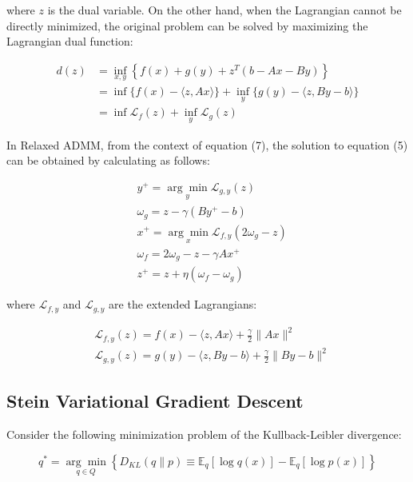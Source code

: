\documentclass[a4paper,fleqn,10pt,twocolumn]{SICE_ISCS}
\begin{document}
where $z$ is the dual variable. On the other hand, when the Lagrangian cannot be directly minimized, the original problem can be solved by maximizing the Lagrangian dual function:

\begin{equation}
\begin{aligned}
d(z) & =\inf _{x, y}\left\{f(x)+g(y)+z^{T}(b-A x-B y)\right\} \\
& =\inf \{f(x)-\langle z, A x\rangle\}+\inf _{y}\{g(y)-\langle z, B y-b\rangle\} \\
& =\inf \mathcal{L}_{f}(z)+\inf _{y} \mathcal{L}_{g}(z)
\end{aligned}
\end{equation}

In Relaxed ADMM, from the context of equation (7), the solution to equation (5) can be obtained by calculating as follows:

\begin{equation}
\begin{aligned}
& y^{+}=\underset{y}{\arg \min } \mathcal{L}_{g, y}(z) \\
& \omega_{g}=z-\gamma\left(B y^{+}-b\right) \\
& x^{+}=\underset{x}{\arg \min } \mathcal{L}_{f, y}\left(2 \omega_{g}-z\right) \\
& \omega_{f}=2 \omega_{g}-z-\gamma A x^{+} \\
& z^{+}=z+\eta\left(\omega_{f}-\omega_{g}\right)
\end{aligned}
\end{equation}

where $\mathcal{L}_{f, y}$ and $\mathcal{L}_{g, y}$ are the extended Lagrangians:

\begin{equation}
\begin{aligned}
& \mathcal{L}_{f, y}(z)=f(x)-\langle z, A x\rangle+\frac{\gamma}{2}\|A x\|^{2} \\
& \mathcal{L}_{g, y}(z)=g(y)-\langle z, B y-b\rangle+\frac{\gamma}{2}\|B y-b\|^{2}
\end{aligned}
\end{equation}

\subsection{Stein Variational Gradient Descent}
Consider the following minimization problem of the Kullback-Leibler divergence:

\begin{equation}
q^{*}=\underset{q \in Q}{\arg \min }\left\{D_{K L}(q \| p) \equiv \mathbb{E}_{q}[\log q(x)]-\mathbb{E}_{q}[\log p(x)]\right\}
\end{equation}
\end{document}
